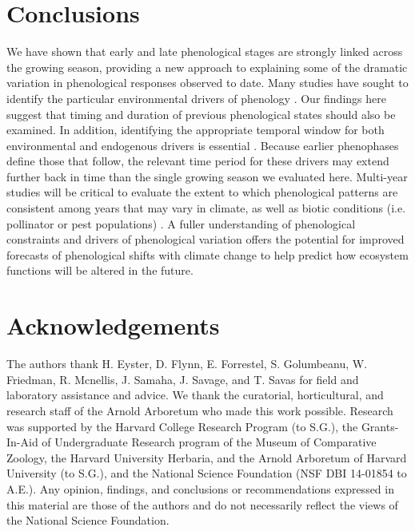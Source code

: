 \documentclass{article}
\begin{document}
\section* {Conclusions}
We have shown that early and late phenological stages are strongly linked across the growing season, providing a new approach to explaining some of the dramatic variation in phenological responses observed to date.  Many studies have sought to identify the particular environmental drivers of phenology \citep [e.g.,][]{morin2010,schwartz2013}. Our findings here suggest that timing and duration of previous phenological states should also be examined. In addition, identifying the appropriate temporal window for both environmental and endogenous drivers is essential \citep{teller2016}. Because earlier phenophases define those that follow, the relevant time period for these drivers may extend further back in time than the single growing season we evaluated here. Multi-year studies will be critical to evaluate the extent to which phenological patterns are consistent among years that may vary in climate, as well as biotic conditions (i.e. pollinator or pest populations)  \citep{lechowicz1995}. %
A fuller understanding of phenological constraints and drivers of phenological variation offers the potential for improved forecasts of phenological shifts  with climate change to help predict how ecosystem functions will be altered in the future. 

\section*{Acknowledgements} %
The authors thank H. Eyster, D. Flynn, E. Forrestel, S. Golumbeanu, W. Friedman, R. Mcnellis, J. Samaha, J. Savage, and T. Savas for field and laboratory assistance and advice. We thank the curatorial, horticultural, and research staff of the Arnold Arboretum who made this work possible. Research was supported by the Harvard College Research Program (to S.G.), the Grants-In-Aid of Undergraduate Research program of the Museum of Comparative Zoology, the Harvard University Herbaria, and the Arnold Arboretum of Harvard University (to S.G.), and the National Science Foundation (NSF DBI 14-01854 to A.E.). Any opinion, findings, and conclusions or recommendations expressed in this material are those of the authors and do not necessarily reflect the views of the National Science Foundation.
\end{document}
